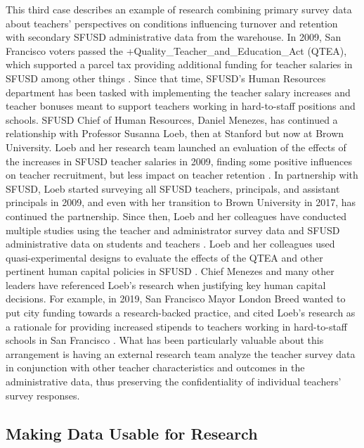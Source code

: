 \documentclass[
]{WileySix}
\begin{document}
This third case describes an example of research combining primary survey data about teachers' perspectives on conditions influencing turnover and retention with secondary SFUSD administrative data from the warehouse. In 2009, San Francisco voters passed the +Quality\_Teacher\_and\_Education\_Act\textbar{} (QTEA), which supported a parcel tax providing additional funding for teacher salaries in SFUSD among other things \citep{hough2009}. Since that time, SFUSD's Human Resources department has been tasked with implementing the teacher salary increases and teacher bonuses meant to support teachers working in hard-to-staff positions and schools. SFUSD Chief of Human Resources, Daniel Menezes, has continued a relationship with Professor Susanna Loeb, then at Stanford but now at Brown University. Loeb and her research team launched an evaluation of the effects of the increases in SFUSD teacher salaries in 2009, finding some positive influences on teacher recruitment, but less impact on teacher retention \citep{hough2013}. In partnership with SFUSD, Loeb started surveying all SFUSD teachers, principals, and assistant principals in 2009, and even with her transition to Brown University in 2017, has continued the partnership. Since then, Loeb and her colleagues have conducted multiple studies using the teacher and administrator survey data and SFUSD administrative data on students and teachers \citep{dizon-ross2019}. Loeb and her colleagues used quasi-experimental designs to evaluate the effects of the QTEA and other pertinent human capital policies in SFUSD \citep{sun2017}. Chief Menezes and many other leaders have referenced Loeb's research when justifying key human capital decisions. For example, in 2019, San Francisco Mayor London Breed wanted to put city funding towards a research-backed practice, and cited Loeb's research as a rationale for providing increased stipends to teachers working in hard-to-staff schools in San Francisco \citep{waxmann2019}. What has been particularly valuable about this arrangement is having an external research team analyze the teacher survey data in conjunction with other teacher characteristics and outcomes in the administrative data, thus preserving the confidentiality of individual teachers' survey responses.

\hypertarget{making-data-usable-for-research-4}{%
\subsection{Making Data Usable for Research}\label{making-data-usable-for-research-4}}
\end{document}
